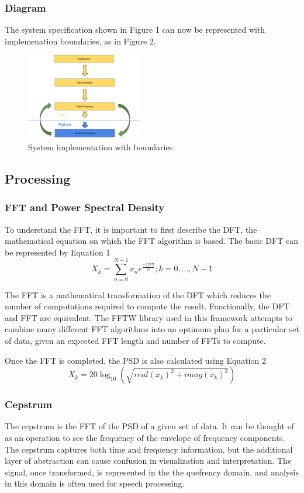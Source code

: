 \documentclass[journal]{IEEEtran}
\begin{document}
\subsubsection{Diagram}
The system specification shown in Figure 1 can now be represented with implemenation boundaries, as in Figure 2.
\begin{figure}[h!]
\centering
  \includegraphics[width=0.45\textwidth]{fig2.png}
\caption{System implementation with boundaries}
\end{figure}

\subsection{Processing}
\subsubsection{FFT and Power Spectral Density}
To understand the FFT, it is important to first describe the DFT, the mathematical equation on which the FFT algorithm is based.
The basic DFT can be represented by Equation 1
\begin{equation}
X_k = \sum_{n=0}^{N-1}x_ne^{\frac{-j2k\pi}{N}};k = 0,...,N-1
\end{equation}

The FFT is a mathematical transformation of the DFT which reduces the number of computations required to compute the result. 
Functionally, the DFT and FFT are equivalent. The FFTW library used in this framework attempts to combine many different FFT algorithms into
 an optimum plan for a particular set of data, given an expected FFT length and number of FFTs to compute.

Once the FFT is completed, the PSD is also calculated using Equation 2
\begin{equation}
X_k = 20\log_{10}(\sqrt{real(x_k)^2 + imag(x_k)^2})
\end{equation}

\subsubsection{Cepstrum}
The cepstrum is the FFT of the PSD of a given set of data. It can be thought of as an operation to see the frequency of the envelope of
 frequency components. The cepstrum captures both time and frequency information, but the additional layer of abstraction can cause confusion in 
visualization and interpretation. The signal, once transformed, is represented in the the quefrency domain, and analysis in this domain is 
often used for speech processing.
\end{document}
